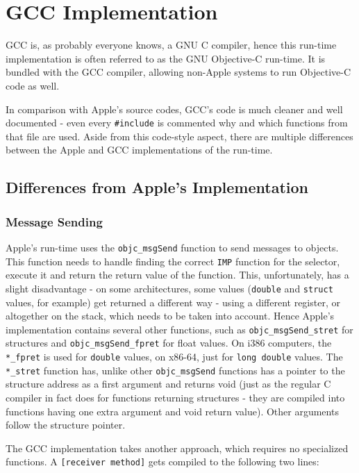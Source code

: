 \chapter{GCC Implementation}

GCC is, as probably everyone knows, a GNU C compiler, hence this run-time implementation is often referred to as the GNU Objective-C run-time. It is bundled with the GCC compiler, allowing non-Apple systems to run Objective-C code as well.

In comparison with Apple's source codes, GCC's code is much cleaner and well documented - even every \verb=#include= is commented why and which functions from that file are used. Aside from this code-style aspect, there are multiple differences between the Apple and GCC implementations of the run-time.

\section{Differences from Apple's Implementation}
\subsection{Message Sending}
Apple's run-time uses the \verb=objc_msgSend= function to send messages to objects. This function needs to handle finding the correct \verb=IMP= function for the selector, execute it and return the return value of the function. This, unfortunately, has a slight disadvantage - on some architectures, some values (\verb=double= and \verb=struct= values, for example) get returned a different way - using a different register, or altogether on the stack, which needs to be taken into account. Hence Apple's implementation contains several other functions, such as \verb=objc_msgSend_stret= for structures and \verb=objc_msgSend_fpret= for float values. On i386 computers, the \verb=*_fpret= is used for \verb=double= values, on x86-64, just for \verb=long double= values. The \verb=*_stret= function has, unlike other \verb=objc_msgSend= functions has a pointer to the structure address as a first argument and returns void (just as the regular C compiler in fact does for functions returning structures - they are compiled into functions having one extra argument and void return value). Other arguments follow the structure pointer.

The GCC implementation takes another approach, which requires no specialized functions. A \verb=[receiver method]= gets compiled to the following two lines:

